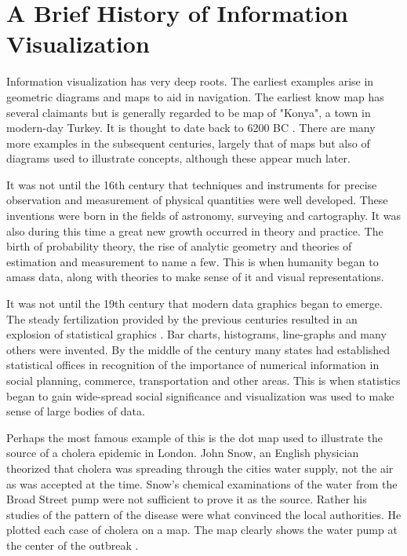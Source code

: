 \documentclass[a4paper, 10pt, titlepage]{article}
\begin{document}
\section{A Brief History of Information Visualization}
Information visualization has very deep roots. The earliest examples arise in geometric diagrams and maps to aid in navigation. The earliest know map has several claimants but is generally regarded to be map of "Konya", a town in modern-day Turkey. It is thought to date back to 6200 BC \cite{bagrow2009history}. There are many more examples in the subsequent centuries, largely that of maps but also of diagrams used to illustrate concepts, although these appear much later.

It was not until the 16th century that techniques and instruments for precise observation and measurement of physical quantities were well developed. These inventions were born in the fields of astronomy, surveying and cartography. It was also during this time a great new growth occurred in theory and practice. The birth of probability theory, the rise of analytic geometry and theories of estimation and measurement to name a few. This is when humanity began to amass data, along with theories to make sense of it and visual representations.

It was not until the 19th century that modern data graphics began to emerge. The steady fertilization provided by the previous centuries resulted in an explosion of statistical graphics \cite{friendly2001milestones}. Bar charts, histograms, line-graphs and many others were invented.  By the middle of the century many states had established statistical offices in recognition of the importance of numerical information in social planning, commerce, transportation and other areas. This is when statistics began to gain wide-spread social significance and visualization was used to make sense of large bodies of data. 

Perhaps the most famous example of this is the dot map used to illustrate the source of a cholera epidemic in London. John Snow, an English physician theorized that cholera was spreading through the cities water supply, not the air as was accepted at the time. Snow's chemical examinations of the water from the Broad Street pump were not sufficient to prove it as the source. Rather his studies of the pattern of the disease were what convinced the local authorities. He plotted each case of cholera on a map. The map clearly shows the water pump at the center of the outbreak \cite{frerichs2007ghost}.
\end{document}
